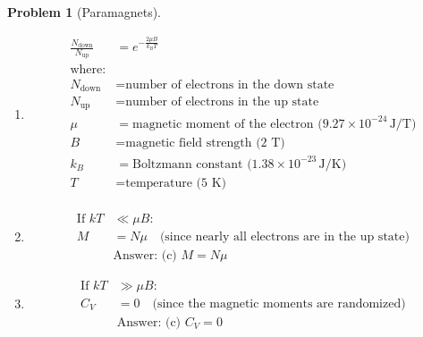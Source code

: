 \documentclass[12pt]{article}
\theoremstyle{definition} %
\newtheorem{problem}{Problem}
\theoremstyle{plain} %
\begin{document}
\begin{problem}[Paramagnets]
    \noindent 
    \begin{enumerate}
        \item \begin{align*}
        \frac{N_{\text{down}}}{N_{\text{up}}} &= e^{-\frac{2 \mu B}{k_B T}} \\
        \text{where:} \\
        N_{\text{down}} &= \text{number of electrons in the down state} \\
        N_{\text{up}} &= \text{number of electrons in the up state} \\
        \mu &= \text{magnetic moment of the electron (} 9.27 \times 10^{-24} \, \text{J/T)} \\
        B &= \text{magnetic field strength (2 T)} \\
        k_B &= \text{Boltzmann constant (} 1.38 \times 10^{-23} \, \text{J/K)} \\
        T &= \text{temperature (5 K)} \\
        \end{align*}
        \item \begin{align*}
            \text{If } kT &\ll \mu B: \\
            M &= N \mu \quad \text{(since nearly all electrons are in the up state)} \\
            &\text{Answer: (c) } M = N \mu
        \end{align*}
        \item \begin{align*}
        \text{If } kT &\gg \mu B: \\
        C_V &= 0 \quad \text{(since the magnetic moments are randomized)} \\
        &\text{Answer: (c) } C_V = 0
        \end{align*}
    \end{enumerate}
\end{problem}
\end{document}
